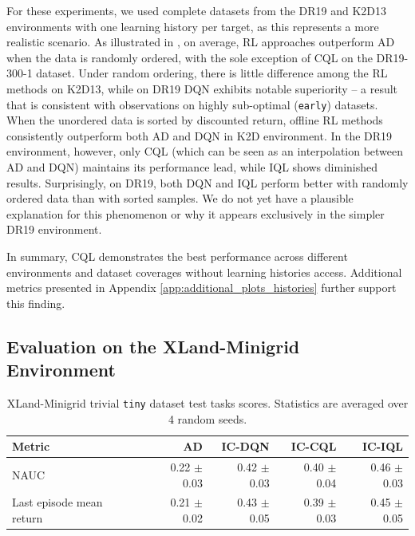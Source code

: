 \documentclass{article} %
\begin{document}
For these experiments, we used complete datasets from the DR19 and K2D13 environments with one learning history per target, as this represents a more realistic scenario. As illustrated in , on average, RL approaches outperform AD when the data is randomly ordered, with the sole exception of CQL on the DR19-300-1 dataset. Under random ordering, there is little difference among the RL methods on K2D13, while on DR19 DQN exhibits notable superiority -- a result that is consistent with observations on highly sub-optimal (\texttt{early}) datasets. When the unordered data is sorted by discounted return, offline RL methods consistently outperform both AD and DQN in K2D environment. In the DR19 environment, however, only CQL (which can be seen as an interpolation between AD and DQN) maintains its performance lead, while IQL shows diminished results. Surprisingly, on DR19, both DQN and IQL perform better with randomly ordered data than with sorted samples. We do not yet have a plausible explanation for this phenomenon or why it appears exclusively in the simpler DR19 environment.

In summary, CQL demonstrates the best performance across different environments and dataset coverages without learning histories access. Additional metrics presented in Appendix \ref{app:additional_plots_histories} further support this finding.

\subsection{Evaluation on the XLand-Minigrid Environment}
\begin{table}[ht]
\centering
\caption{XLand-Minigrid trivial \texttt{tiny} dataset test tasks scores. Statistics are averaged over 4 random seeds.}
\label{table:xland}
\begin{tabular}{l|rrrr}
\toprule
\textbf{Metric} & \textbf{AD} & \textbf{IC-DQN} & \textbf{IC-CQL} & \textbf{IC-IQL}\\
\midrule
NAUC &  0.22 $\pm$ 0.03 & 0.42 $\pm$ 0.03 & 0.40 $\pm$ 0.04 & 0.46 $\pm$ 0.03\\
Last episode mean return & 0.21 $\pm$ 0.02 & 0.43 $\pm$ 0.05 & 0.39 $\pm$ 0.03 & 0.45 $\pm$ 0.05 \\
\bottomrule
\end{tabular}
\label{tab:xland-result}
\end{table}
\end{document}
